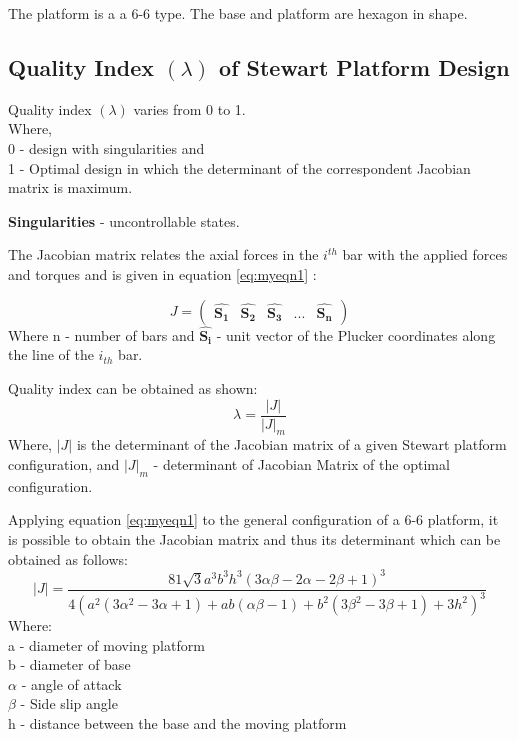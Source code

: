 The platform is a a 6-6 type. The base and platform are hexagon in shape.

\subsection{Quality Index $(\lambda)$ of Stewart Platform Design}
Quality index $(\lambda)$ varies from 0 to 1.\\
Where,\\
0 - design with singularities and\\
1 - Optimal design in which the determinant of the correspondent Jacobian matrix is maximum.

\textbf{Singularities} - uncontrollable states.

The Jacobian matrix relates the axial forces in the $i^{th}$ bar with the applied
forces and torques and is given in equation \eqref{eq:myeqn1} \cite{fernandes_design_nodate}:

\begin{equation}
J =
\begin{pmatrix}
\hat{\boldsymbol{S_{1}}} & \hat{\boldsymbol{S_{2}}} & \hat{\boldsymbol{S_{3}}} & ... & \hat{\boldsymbol{S_{n}}}
\end{pmatrix}
\label{eq:myeqn1}
\end{equation}
Where n - number of bars and $ \hat{\boldsymbol{S_{i}}}$ - unit vector of the Plucker coordinates along the line of the
$i_{th}$ bar.

Quality index can be obtained as shown:
\begin{equation}
\lambda = \frac{|J|}{|J|_{m}}
\label{eq:myeqn}
\end{equation}
Where, $|J|$ is the determinant of the Jacobian matrix of a given Stewart platform configuration, and $ |J|_{m} $ - determinant of Jacobian Matrix of the optimal configuration.

Applying equation \eqref{eq:myeqn1} to the general configuration of a 6-6 platform, it is
possible to obtain the Jacobian matrix and thus its determinant which can be obtained as follows:
\begin{equation}
|J| =
\frac{81 \sqrt{3} a^3 b^3 h^3 (3 \alpha \beta - 2 \alpha - 2 \beta +1)^3}{4(a^2(3 \alpha^2 - 3 \alpha + 1)+ ab(\alpha \beta - 1 )+ b^2(3 \beta^2 - 3 \beta + 1)+ 3h^2)^3}
\label{eq:myeqn02}
\end{equation}
Where:\\
a - diameter of moving platform\\
b - diameter of base\\
$\alpha$ - angle of attack\\
$ \beta $ - Side slip angle\\
h - distance between the base and the moving platform\\


